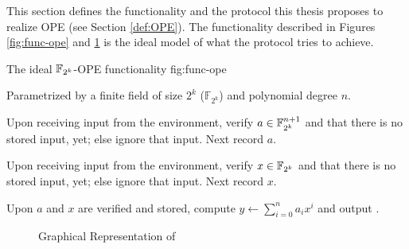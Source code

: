 %
%
\label{sec:protocol}


This section defines the functionality \JWfuncSymOPE and the protocol
\JWprotoSymOPE this thesis proposes to realize OPE (see Section \ref{def:OPE}).
The functionality described in Figures \ref{fig:func-ope} and
\ref{fig:graph-ope} is the ideal model of what the protocol tries to achieve.

\begin{JWfunc}%
  {\JWfuncSymOPE}%
  {The ideal $\mathbb{F}_{2^k}{}$-OPE functionality \JWfuncSymOPE{}}%
  {fig:func-ope}

  Parametrized by a finite field of size $2^k$ ($\mathbb{F}_{2^k}$)
  and polynomial degree $n$.

  \begin{JWfuncSteps}

  \item Upon receiving input  from the environment, verify
    $a \in \mathbb{F}_{2^k}^{n+1}$ and that there is no stored input, yet; else
    ignore that input. Next record $a$.

  \item Upon receiving input  from the environment,
    verify $x \in \mathbb{F}_{2^k}{}$ and that there is no stored input, yet;
    else ignore that input. Next record $x$.

  \item Upon $a$ and $x$ are verified and stored, compute $y \leftarrow
    \sum_{i=0}^n a_ix^i$ and output .

  \end{JWfuncSteps}
\end{JWfunc}

\begin{figure}[ht]

  \centering


  \caption{Graphical Representation of \JWfuncSymOPE}
  \label{fig:graph-ope}

\end{figure}


